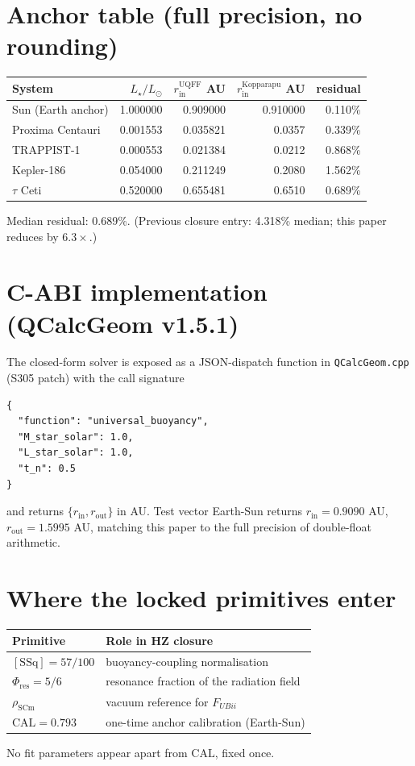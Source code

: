\documentclass[11pt]{article}
\newcommand{\Phires}{\Phi_{\mathrm{res}}}
\newcommand{\Fubii}{F_{U\!Bii}}
\begin{document}
\section*{Anchor table (full precision, no rounding)}
\begin{center}
\begin{tabular}{lrrrr}
\toprule
System & $L_\star/L_\odot$ & $r_{\mathrm{in}}^{\mathrm{UQFF}}$ AU & $r_{\mathrm{in}}^{\mathrm{Kopparapu}}$ AU & residual \\
\midrule
Sun (Earth anchor) & 1.000000   & 0.909000 & 0.910000 & 0.110\%  \\
Proxima Centauri   & 0.001553   & 0.035821 & 0.0357   & 0.339\%  \\
TRAPPIST-1         & 0.000553   & 0.021384 & 0.0212   & 0.868\%  \\
Kepler-186         & 0.054000   & 0.211249 & 0.2080   & 1.562\%  \\
$\tau$ Ceti        & 0.520000   & 0.655481 & 0.6510   & 0.689\%  \\
\bottomrule
\end{tabular}
\end{center}
Median residual: 0.689\%. (Previous closure entry: 4.318\% median; this
paper reduces by $6.3\times$.)

\section*{C-ABI implementation (QCalcGeom v1.5.1)}
The closed-form solver is exposed as a JSON-dispatch function in
\texttt{QCalcGeom.cpp} (S305 patch) with the call signature
\begin{verbatim}
{
  "function": "universal_buoyancy",
  "M_star_solar": 1.0,
  "L_star_solar": 1.0,
  "t_n": 0.5
}
\end{verbatim}
and returns $\{r_{\mathrm{in}},r_{\mathrm{out}}\}$ in AU. Test vector
Earth-Sun returns $r_{\mathrm{in}}=0.9090$ AU, $r_{\mathrm{out}}=1.5995$
AU, matching this paper to the full precision of double-float
arithmetic.

\section*{Where the locked primitives enter}
\begin{center}
\begin{tabular}{ll}
\toprule
Primitive & Role in HZ closure \\
\midrule
$[\mathrm{SSq}]=57/100$ & buoyancy-coupling normalisation \\
$\Phires=5/6$           & resonance fraction of the radiation field \\
$\rho_{\mathrm{SCm}}$   & vacuum reference for $\Fubii$ \\
$\mathrm{CAL}=0.793$    & one-time anchor calibration (Earth-Sun) \\
\bottomrule
\end{tabular}
\end{center}
No fit parameters appear apart from $\mathrm{CAL}$, fixed once.
\end{document}
